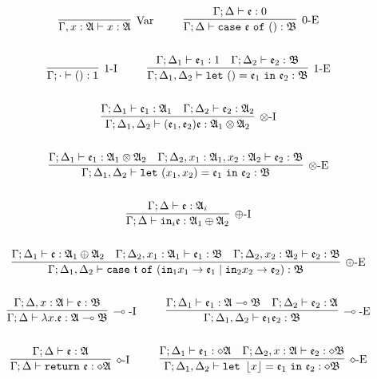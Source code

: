 \begin{gather*}
\infer[\mbox{Var}]{\Gamma, x: \A \vdash x : \A}{}
~~~~ ~~~~
\infer[0\mbox{-E}]{\Gamma; \Delta \vdash \mathtt{case}~\e~\mathtt{of}~() : \mathfrak{B}}{\Gamma; \Delta \vdash \e : 0}
\\ \\ 
\infer[1\mbox{-I}]{\Gamma; \cdot \vdash () : 1}{}
~~~~ ~~~~
\infer[1\mbox{-E}]{\Gamma; \Delta_1, \Delta_2 \vdash \mathtt{let}~() = \e_1~\mathtt{in}~\e_2 : \mathfrak{B}}{
    \Gamma; \Delta_1 \vdash \e_1 : 1
    &
    \Gamma; \Delta_2 \vdash \e_2 : \mathfrak{B}
}
\\ \\ 
\infer[\otimes\mbox{-I}]{\Gamma; \Delta_1, \Delta_2 \vdash (\e_1, \e_2) \e : \A_1 \otimes \A_2}{
    \Gamma; \Delta_1 \vdash \e_1 : \A_1
    &
    \Gamma; \Delta_2 \vdash \e_2 : \A_2
}
\\ \\ 
\infer[\otimes\mbox{-E}]{\Gamma; \Delta_1, \Delta_2 \vdash \mathtt{let}~(x_1, x_2) = \e_1~\mathtt{in}~\e_2 : \mathfrak{B}}{
    \Gamma; \Delta_1 \vdash \e_1 : \A_1 \otimes \A_2
    &
    \Gamma; \Delta_2, x_1 : \A_1, x_2 : \A_2 \vdash \e_2 : \mathfrak{B}
}
\\ \\ 
\infer[\oplus\mbox{-I}]{\Gamma; \Delta \vdash \mathtt{in}_i \e : \A_1 \oplus \A_2}{\Gamma; \Delta \vdash \e : \A_i}
\\ \\
\infer[\oplus\mbox{-E}]{\Gamma; \Delta_1, \Delta_2 \vdash \mathtt{case}~\t~\mathtt{of}~(\mathtt{in}_1 x_1 \rightarrow \e_1 \mid \mathtt{in}_2 x_2 \rightarrow \e_2) : \mathfrak{B}}{
    \Gamma; \Delta_1 \vdash \e : \A_1 \oplus \A_2
    &
    \Gamma; \Delta_2, x_1 : \A_1 \vdash \e_1 : \mathfrak{B}
    &
    \Gamma; \Delta_2, x_2 : \A_2 \vdash \e_2 : \mathfrak{B}
}
\\ \\ 
\infer[\multimap\mbox{-I}]{\Gamma; \Delta \vdash \lambda x. \e : \A \multimap \mathfrak{B}}{\Gamma; \Delta, x : \A \vdash \e : \mathfrak{B}}
~~~~ ~~~~
\infer[\multimap\mbox{-E}]{\Gamma; \Delta_1, \Delta_2 \vdash \e_1\e_2 : \mathfrak{B}}{
    \Gamma; \Delta_1 \vdash \e_1 : \A \multimap \mathfrak{B}
    &
    \Gamma; \Delta_2 \vdash \e_2 : \A
}
\\ \\ 
\infer[\diamond\mbox{-I}]{\Gamma; \Delta \vdash \mathtt{return}~\e : \diamond\A}{\Gamma; \Delta \vdash \e : \A}
~~~~ ~~~~
\infer[\diamond\mbox{-E}]{\Gamma; \Delta_1, \Delta_2 \vdash \mathtt{let}~\floor{x} = \e_1~\mathtt{in}~\e_2 : \diamond\mathfrak{B}}{
    \Gamma; \Delta_1 \vdash \e_1 : \diamond\A
    &
    \Gamma; \Delta_2, x : \A \vdash \e_2 : \diamond\mathfrak{B}
}
\end{gather*}
